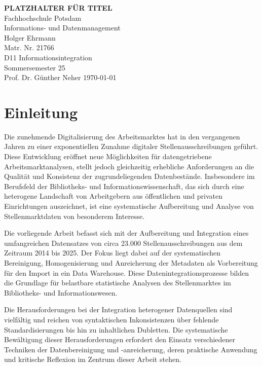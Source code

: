 \documentclass[
    a4paper,
    12pt,
    headinclude=true,
    BCOR=10mm,
]{scrreprt}
\begin{document}
\begin{titlepage}
    \centering
    \vspace*{1cm}
    \Large{\textbf{PLATZHALTER FÜR TITEL}}\\
    \vspace{1.5cm}
    \Large{Fachhochschule Potsdam}\\
    \vspace{0.5cm}
    \large{Informations- und Datenmanagement}\\
    \vspace{1.5cm}
    Holger Ehrmann\\
    Matr. Nr. 21766\\
    \vspace{1cm}
    D11 Informationsintegration\\
    Sommersemester 25\\
    Prof. Dr. Günther Neher
    \vfill
    \today
\end{titlepage}
\setcounter{tocdepth}{1}
\begingroup
{} %
{\small \tableofcontents}
\endgroup

\chapter{Einleitung}

Die zunehmende Digitalisierung des Arbeitsmarktes hat in den vergangenen Jahren zu einer exponentiellen Zunahme digitaler Stellenausschreibungen geführt. Diese Entwicklung eröffnet neue Möglichkeiten für datengetriebene Arbeitsmarktanalysen, stellt jedoch gleichzeitig erhebliche Anforderungen an die Qualität und Konsistenz der zugrundeliegenden Datenbestände. Insbesondere im Berufsfeld der Bibliotheks- und Informationswissenschaft, das sich durch eine heterogene Landschaft von Arbeitgebern aus öffentlichen und privaten Einrichtungen auszeichnet, ist eine systematische Aufbereitung und Analyse von Stellenmarktdaten von besonderem Interesse.

Die vorliegende Arbeit befasst sich mit der Aufbereitung und Integration eines umfangreichen Datensatzes von circa 23.000 Stellenausschreibungen aus dem Zeitraum 2014 bis 2025. Der Fokus liegt dabei auf der systematischen Bereinigung, Homogenisierung und Anreicherung der Metadaten als Vorbereitung für den Import in ein Data Warehouse. Diese Datenintegrationsprozesse bilden die Grundlage für belastbare statistische Analysen des Stellenmarktes im Bibliotheks- und Informationswesen.

Die Herausforderungen bei der Integration heterogener Datenquellen sind vielfältig und reichen von syntaktischen Inkonsistenzen über fehlende Standardisierungen bis hin zu inhaltlichen Dubletten. Die systematische Bewältigung dieser Herausforderungen erfordert den Einsatz verschiedener Techniken der Datenbereinigung und -anreicherung, deren praktische Anwendung und kritische Reflexion im Zentrum dieser Arbeit stehen.
\end{document}
